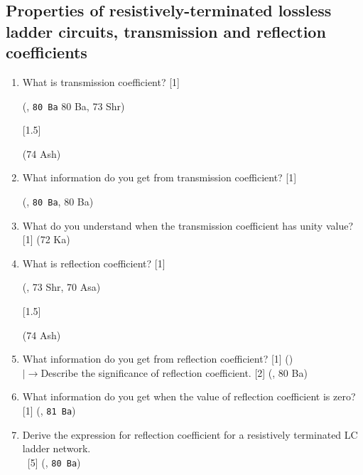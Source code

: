 \documentclass[12pt]{article}
\newcommand{\lb}{\\$\left|\rightarrow\right.$}
\newcommand{\enter}{\\\textcolor{white}{1}}
\begin{document}
	\subsection{Properties of resistively-terminated lossless ladder circuits, transmission and reflection coefficients}
		\begin{enumerate}
			\item What is transmission coefficient? \hfill [1] \begin{footnotesize} (, \texttt{80 Ba} 80 Ba, 73 Shr) \end{footnotesize} [1.5] \begin{footnotesize} (74 Ash) \end{footnotesize}
			
			\item What information do you get from transmission coefficient? \hfill [1] \begin{footnotesize} (, \texttt{80 Ba}, 80 Ba) \end{footnotesize}
			
			\item What do you understand when the transmission coefficient has unity value? \hfill [1] (72 Ka)

			\item What is reflection coefficient? \hfill [1] \begin{footnotesize} (, 73 Shr, 70 Asa) \end{footnotesize} [1.5] \begin{footnotesize} (74 Ash) \end{footnotesize}
			
			\item What information do you get from reflection coefficient? \hfill [1] ()
			\lb Describe the significance of reflection coefficient. \hfill [2] (, 80 Ba)
			
			\item What information do you get when the value of reflection coefficient is zero? \hfill [1] (, \texttt{81 Ba})
			
			\item Derive the expression for reflection coefficient for a resistively terminated LC ladder network.
			\enter\hfill [5] (, \texttt{80 Ba})
		\end{enumerate}
		
\end{document}
